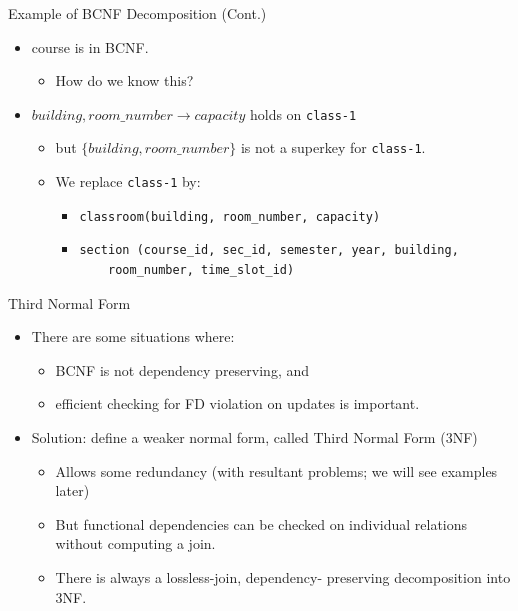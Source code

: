 \documentclass{beamer}
\begin{document}
\begin{frame}[fragile]{Example of BCNF Decomposition (Cont.)}
    \footnotesize
    \begin{itemize}
        \item course is in BCNF.
            \begin{itemize}
                \item How do we know this?
            \end{itemize}
        \item $building, room\_number \rightarrow capacity$ holds on \texttt{class-1}
            \begin{itemize}
                \item but $\{ building, room\_number \}$ is not a superkey for \texttt{class-1}.
                \item We replace \texttt{class-1} by:
                    \begin{itemize}
                        \item \verb|classroom(building, room_number, capacity)|
                        \item \begin{verbatim}
section (course_id, sec_id, semester, year, building,
    room_number, time_slot_id)
                              \end{verbatim}
                    \end{itemize}
            \end{itemize}
    \end{itemize}
\end{frame}

\begin{frame}{Third Normal Form}
    \begin{itemize}
        \item There are some situations where:
            \begin{itemize}
                \item BCNF is not dependency preserving, and
                \item efficient checking for FD violation on updates is important.
            \end{itemize}
        \item Solution: define a weaker normal form, called Third Normal Form (3NF)
            \begin{itemize}
                \item Allows some redundancy (with resultant problems; we will see examples later)
                \item But functional dependencies can be checked on individual relations without computing a join.
                \item There is always a lossless-join, dependency- preserving decomposition into 3NF.
            \end{itemize}
    \end{itemize}
\end{frame}
\end{document}
